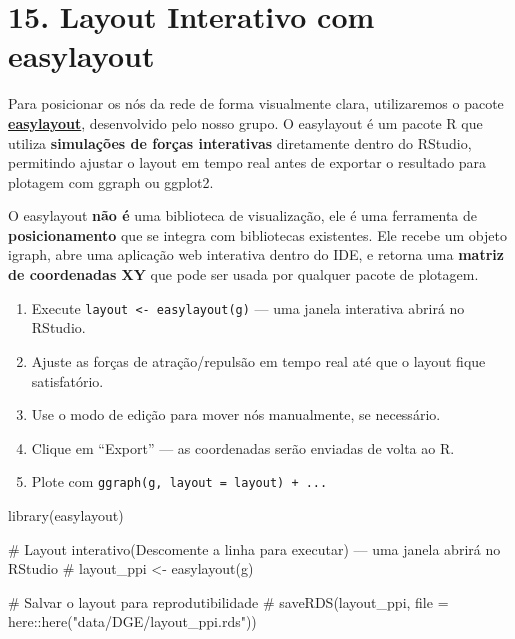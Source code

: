 \documentclass[
  letterpaper,
  DIV=11,
  numbers=noendperiod]{scrreprt}
\newenvironment{Shaded}{\begin{snugshade}}{\end{snugshade}}
\newcommand{\CommentTok}[1]{\textcolor[rgb]{0.37,0.37,0.37}{#1}}
\newcommand{\FunctionTok}[1]{\textcolor[rgb]{0.28,0.35,0.67}{#1}}
\newcommand{\NormalTok}[1]{\textcolor[rgb]{0.00,0.23,0.31}{#1}}
\providecommand{\tightlist}{%
  \setlength{\itemsep}{0pt}\setlength{\parskip}{0pt}}
\begin{document}
\section{15. Layout Interativo com
easylayout}\label{layout-interativo-com-easylayout}

Para posicionar os nós da rede de forma visualmente clara, utilizaremos
o pacote
\href{https://github.com/dalmolingroup/easylayout}{\textbf{easylayout}},
desenvolvido pelo nosso grupo. O easylayout é um pacote R que utiliza
\textbf{simulações de forças interativas} diretamente dentro do RStudio,
permitindo ajustar o layout em tempo real antes de exportar o resultado
para plotagem com ggraph ou ggplot2.

O easylayout \textbf{não é} uma biblioteca de visualização, ele é uma
ferramenta de \textbf{posicionamento} que se integra com bibliotecas
existentes. Ele recebe um objeto igraph, abre uma aplicação web
interativa dentro do IDE, e retorna uma \textbf{matriz de coordenadas
XY} que pode ser usada por qualquer pacote de plotagem.

\begin{tcolorbox}[enhanced jigsaw, arc=.35mm, bottomrule=.15mm, bottomtitle=1mm, breakable, colback=white, colbacktitle=quarto-callout-tip-color!10!white, colframe=quarto-callout-tip-color-frame, coltitle=black, left=2mm, leftrule=.75mm, opacityback=0, opacitybacktitle=0.6, rightrule=.15mm, title=\textcolor{quarto-callout-tip-color}{\faLightbulb}\hspace{0.5em}{Usando o easylayout na prática}, titlerule=0mm, toprule=.15mm, toptitle=1mm]

\begin{enumerate}
\def\labelenumi{\arabic{enumi}.}
\tightlist
\item
  Execute \texttt{layout\ \textless{}-\ easylayout(g)} --- uma janela
  interativa abrirá no RStudio.
\item
  Ajuste as forças de atração/repulsão em tempo real até que o layout
  fique satisfatório.
\item
  Use o modo de edição para mover nós manualmente, se necessário.
\item
  Clique em ``Export'' --- as coordenadas serão enviadas de volta ao R.
\item
  Plote com \texttt{ggraph(g,\ layout\ =\ layout)\ +\ ...}
\end{enumerate}

\end{tcolorbox}

\begin{Shaded}
\begin{Highlighting}[]
\FunctionTok{library}\NormalTok{(easylayout)}

\CommentTok{\# Layout interativo(Descomente a linha para executar) — uma janela abrirá no RStudio}
\CommentTok{\# layout\_ppi \textless{}{-} easylayout(g)}

\CommentTok{\# Salvar o layout para reprodutibilidade}
\CommentTok{\# saveRDS(layout\_ppi, file = here::here("data/DGE/layout\_ppi.rds"))}
\end{Highlighting}
\end{Shaded}
\end{document}
